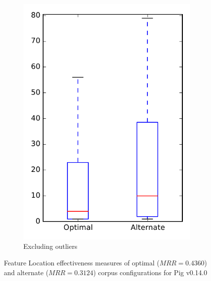 \begin{figure}
\begin{subfigure}{.4\textwidth}
        \includegraphics[height=0.4\textheight]{figures/combo/flt_rq2_pig_no_outlier}
        \caption{Excluding outliers}\label{fig:combo:flt:rq2:pig_no_outlier}
    \end{subfigure}
\caption[Feature Location effectiveness measures of optimal and alternate corpus configurations for Pig v0.14.0]%
{Feature Location effectiveness measures of optimal ($MRR=0.4360$) and alternate ($MRR=0.3124$) corpus configurations for Pig v0.14.0}
\label{fig:combo:flt:rq2:pig}
\end{figure}
